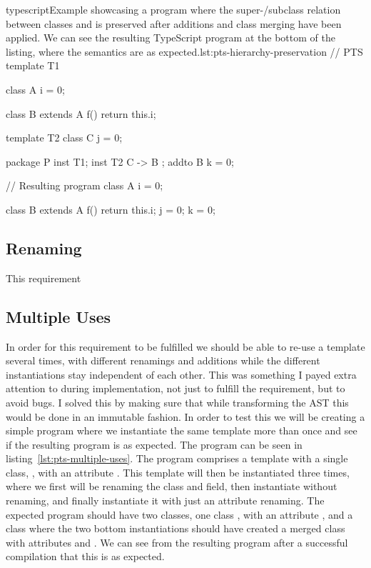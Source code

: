 \begin{code}{typescript}{Example showcasing a program where the super-/subclass relation between classes  and  is preserved after additions and class merging have been applied. We can see the resulting TypeScript program at the bottom of the listing, where the semantics are as expected.}{lst:pts-hierarchy-preservation}
    // PTS
    template T1 {
        class A {
            i = 0;
        }

        class B extends A {
            f() {
                return this.i;
            }
        }
    }

    template T2 {
        class C {
            j = 0;
        }
    }

    package P {
        inst T1;
        inst T2 { C -> B };
        addto B {
            k = 0;
        }
    }

    // Resulting program
    class A {
        i = 0;
    }

    class B extends A {
        f() {
            return this.i;
        }
        j = 0;
        k = 0;
    }
\end{code}

\subsection{Renaming}

This requirement

\subsection{Multiple Uses}

In order for this requirement to be fulfilled we should be able to re-use a template several times, with different renamings and additions while the different instantiations stay independent of each other.
This was something I payed extra attention to during implementation, not just to fulfill the requirement, but to avoid bugs.
I solved this by making sure that while transforming the AST this would be done in an immutable fashion.
In order to test this we will be creating a simple program where we instantiate the same template more than once and see if the resulting program is as expected.
The program can be seen in listing~\vref{lst:pts-multiple-uses}.
The program comprises a template  with a single class, , with an attribute .
This template will then be instantiated three times, where we first will be renaming the class and field, then instantiate without renaming, and finally instantiate it with just an attribute renaming.
The expected program should have two classes, one class , with an attribute , and a class  where the two bottom instantiations should have created a merged class with attributes  and .
We can see from the resulting program after a successful compilation that this is as expected.


